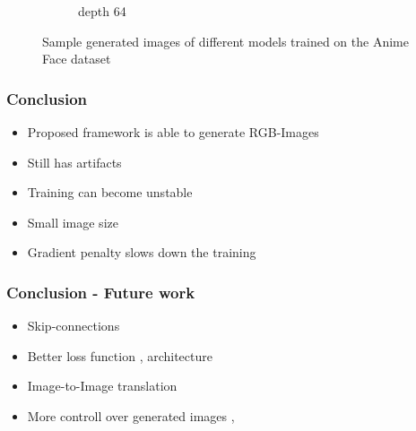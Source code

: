 \begin{frame}
\begin{center}
\begin{figure}[H]
\begin{subfigure}[b]{0.24\textwidth}
                \caption{depth 64}
                \label{fig:anime_64}
            \end{subfigure}
            \caption{Sample generated images of different models trained on the Anime Face dataset}
            \label{fig:ouput_anime}
        \end{figure}

    
    \end{center}
\end{frame}

\begin{frame}
    \frametitle{Conclusion}

    \begin{center}
        \begin{itemize}
            \item Proposed framework is able to generate RGB-Images
            \item Still has artifacts
            \item Training can become unstable 
            \item Small image size
            \item Gradient penalty slows down the training
        \end{itemize}
    \end{center}
\end{frame}

\begin{frame}
    \frametitle{Conclusion - Future work}

    \begin{center}
            \begin{itemize}
                \item Skip-connections \cite{karnewar2020msggan}
                \item Better loss function \cite{realness} \cite{jolicoeurmartineau2018rahinge}, architecture
                \item Image-to-Image translation \cite{cyclegan}
                \item More controll over generated images \cite{stylegan}, \cite{stylegan2}
            \end{itemize}
    \end{center}
\end{frame}